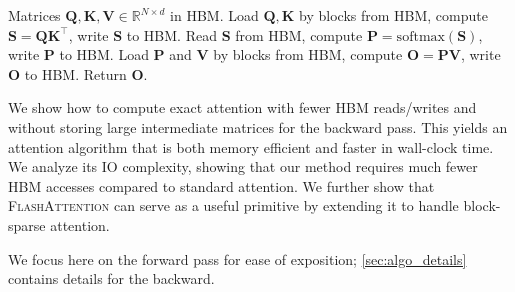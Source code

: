 \documentclass{article}
\newcommand{\softmax}{\mathrm{softmax}}
\newcommand{\vQ}{\mathbf{Q}}
\newcommand{\vK}{\mathbf{K}}
\newcommand{\vV}{\mathbf{V}}
\newcommand{\vS}{\mathbf{S}}
\newcommand{\vP}{\mathbf{P}}
\newcommand{\vO}{\mathbf{O}}
\newcommand{\sysname}{\textsc{FlashAttention}\xspace}
\begin{document}
\vspace{-0.5em}
\setcounter{algorithm}{-1}
\begin{algorithm}[H]
  \caption{\small\label{alg:standard_attn}Standard Attention Implementation}
  \begin{algorithmic}[1]
    \REQUIRE Matrices $\vQ, \vK, \vV \in \mathbb{R}^{N \times d}$ in HBM.
    \STATE \label{alg:standard_attn_qk} Load $\vQ, \vK$ by blocks from HBM, compute
    $\vS = \vQ \vK^\top$, write $\vS$ to HBM.
    \STATE \label{alg:standard_attn_sp} Read $\vS$ from HBM, compute $\vP = \softmax(\vS)$, write $\vP$ to
    HBM.
    \STATE \label{alg:standard_attn_pv} Load $\vP$ and $\vV$ by blocks from HBM, compute $\vO = \vP\vV$, write $\vO$ to
    HBM.
    \STATE Return $\vO$.
  \end{algorithmic}
\end{algorithm}
\vspace{-1.0em}

\iftoggle{icmlworkshop}{
\section{\sysname: Efficient Attention with Tiling \& Recomputation}
}{
\section{\sysname: Algorithm, Analysis, and Extensions}
}
\label{sec:algo}

We show how to compute exact attention with fewer HBM reads/writes and without storing large intermediate matrices for the backward pass.
This yields an attention algorithm that is both memory efficient and faster
in wall-clock time.
We analyze its IO complexity, showing that our method requires
much fewer HBM accesses compared to standard attention.
We further show that \sysname can serve as a useful primitive by extending it to handle block-sparse attention.

\iftoggle{icmlworkshop}{
\cref{sec:background} contains background on GPU architecture and the performance characteristics of common deep learning operations.
We note that attention is memory-bound: its runtime is bottlenecked by the time taken by HBM reads/writes.
}{}
We focus here on the forward pass for ease of exposition; \cref{sec:algo_details} contains details
for the backward.

\iftoggle{icmlworkshop}{}{
\subsection{An Efficient Attention Algorithm With Tiling and Recomputation}
\label{sec:implementation}
}
\end{document}
